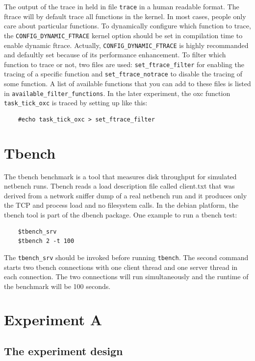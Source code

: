 The output of the trace in held in file \texttt{trace} in a human readable
format. The ftrace will by default trace all functions in the kernel. In
most cases, people only care about particular functions. To dynamically
configure which function to trace, the \texttt{CONFIG\_DYNAMIC\_FTRACE}
kernel option should be set in compilation time  to enable dynamic ftrace. 
Actually, \texttt{CONFIG\_DYNAMIC\_FTRACE} is highly recommanded and defaultly
set because of its performance enhancement. To filter which function to trace
or not, two files are used: \texttt{set\_ftrace\_filter} for enabling the
tracing of a specific function and \texttt{set\_ftrace\_notrace} to 
disable the tracing of some function. A list of available functions that you 
can add to these files is listed in \texttt{available\_filter\_functions}.
In the later experiment, the oxc function \texttt{task\_tick\_oxc} is traced
by setting up like this:
\begin{lstlisting}
	#echo task_tick_oxc > set_ftrace_filter
\end{lstlisting}


\section{Tbench}

The tbench \cite{tbench} benchmark is a tool that measures disk throughput 
for simulated netbench runs. Tbench reads a load description file called 
client.txt that was derived from a network sniffer dump of a real netbench 
run and %
it produces only the TCP and process load and no filesystem calls.
In the debian platform, the tbench tool is part of the dbench package.
One example to run a tbench test:
\begin{lstlisting}
	$tbench_srv
	$tbench 2 -t 100
\end{lstlisting}
The \texttt{tbench\_srv} should be invoked before running \texttt{tbench}.
The second command starts two tbench connections with one client thread 
and one server thread in each connection. The two connections will run 
simultaneously and the runtime of the benchmark will be 100 seconds.

\section{Experiment A}

\subsection{The experiment design}


